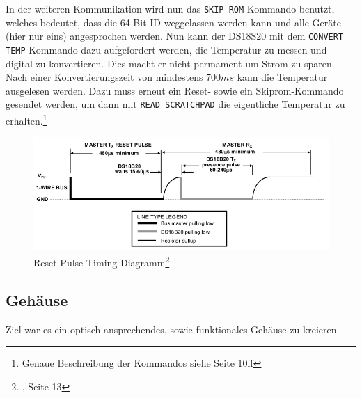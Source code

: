 In der weiteren Kommunikation wird nun das \texttt{SKIP ROM} Kommando benutzt, welches bedeutet, dass die 64-Bit ID weggelassen werden kann und alle Geräte (hier nur eins) angesprochen werden. Nun kann der DS18S20 mit dem \texttt{CONVERT TEMP} Kommando dazu aufgefordert werden, die Temperatur zu messen und digital zu konvertieren. Dies macht er nicht permament um Strom zu sparen. Nach einer Konvertierungszeit von mindestens $700 ms$ kann die Temperatur ausgelesen werden. Dazu muss erneut ein Reset- sowie ein Skiprom-Kommando gesendet werden, um dann mit \texttt{READ SCRATCHPAD} die eigentliche Temperatur zu erhalten.\footnote{Genaue Beschreibung der Kommandos siehe \cite{ds18s20} Seite 10ff}
%
\begin{figure}[htp]
\centering
\centerline{\includegraphics[width=\linewidth]{skizzen/temperatur_reset.png}}
\caption{Reset-Pulse Timing Diagramm\footnote{\cite{ds18s20}, Seite 13}}\label{fig_resettiming}
\end{figure}
%
\subsection{Gehäuse}
%
Ziel war es ein optisch ansprechendes, sowie funktionales Gehäuse zu kreieren. 

